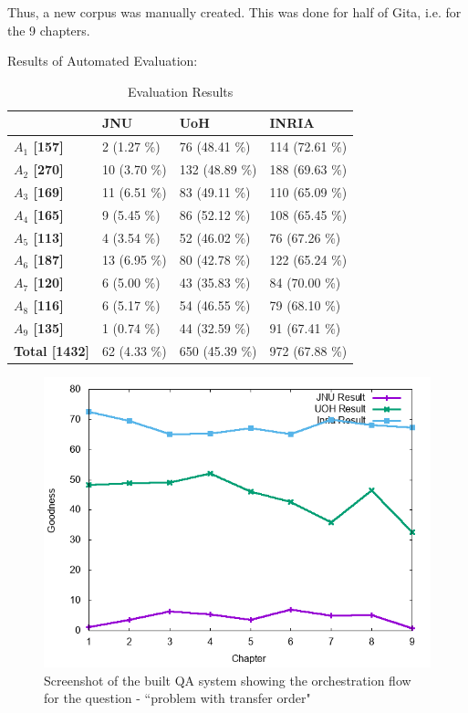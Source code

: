 \documentclass[11pt]{article}
\begin{document}
Thus, a new corpus was manually created. This was done for half of Gita, i.e. for the 9 chapters.


Results of Automated Evaluation:

\begin{table}[h]
\begin{center}
\begin{tabular}{p{1.4cm} | p{1.6cm} | p{1.5cm} | p{1.5cm}}
\hline 
 & \bf JNU & \bf UoH & \bf INRIA \\ 
 \hline
 
\bf $A_1$ [157] &   2 (1.27 \%) &   76 (48.41 \%) &   114 (72.61 \%) \\
\bf $A_2$ [270] &   10 (3.70 \%) &   132 (48.89 \%) &   188 (69.63 \%) \\
\bf $A_3$ [169] &   11 (6.51 \%) &   83 (49.11 \%) &   110 (65.09 \%) \\
\bf $A_4$ [165] &   9 (5.45 \%) &   86 (52.12 \%) &   108 (65.45 \%) \\
\bf $A_5$ [113] &   4 (3.54 \%) &   52 (46.02 \%) &   76 (67.26 \%) \\
\bf $A_6$ [187] &   13 (6.95 \%) &   80 (42.78 \%) &   122 (65.24 \%) \\
\bf $A_7$ [120] &   6 (5.00 \%) &   43 (35.83 \%) &   84 (70.00 \%) \\
\bf $A_8$ [116] &   6 (5.17 \%) &   54 (46.55 \%) &   79 (68.10 \%) \\
\bf $A_9$ [135] &   1 (0.74 \%) &   44 (32.59 \%) &   91 (67.41 \%) \\
\bf Total [1432] &   62 (4.33 \%) &   650 (45.39 \%) &   972 (67.88 \%) \\
 
\hline
\end{tabular}
\end{center}
\caption{\label{font-table} Evaluation Results }
\end{table}


\begin{figure}[h]
	\center
	\includegraphics[scale=0.34]{images/split.png}
	\caption{\label{screen}Screenshot of the built QA system showing the orchestration flow for the question - ``problem with transfer order"}
\end{figure}
\end{document}

